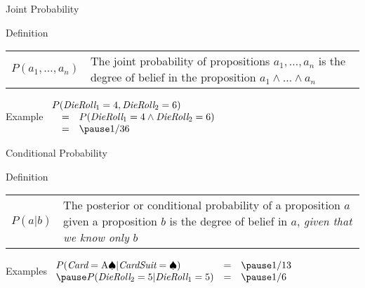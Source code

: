 \documentclass[14pt]{beamer}
\begin{document}
\begin{frame}{Joint Probability}
\begin{block}{Definition}
\begin{tabular}{lm{2.75in}}
\large $P(a_1, \ldots, a_n)$
&
The \alert{joint probability} of propositions $a_1, \ldots, a_n$ is the degree of belief in the proposition $a_1 \land \ldots \land a_n$
\end{tabular}
\end{block}
\pause
\begin{block}{Example}
$
\begin{array}{lll}
\lefteqn{P(\textit{DieRoll}_1 = 4, \textit{DieRoll}_2 = 6)} \\
& = & P(\textit{DieRoll}_1 = 4 \land \textit{DieRoll}_2 = 6) \\
& = & \pause 1/36 \\
\end{array}
$
\end{block}
\end{frame}

\begin{frame}{Conditional Probability}
\begin{block}{Definition}
\begin{tabular}{lm{3.4in}@{}}
\large $P(a|b)$
&
The \alert{posterior} or \alert{conditional probability} of a proposition $a$ given a proposition $b$ is the degree of belief in $a$, \emph{given that we know only $b$}
\end{tabular}
\end{block}
\pause
\begin{block}{Examples}
$
\begin{array}{lll}
P(\textit{Card} = \mbox{A}\spadesuit|\textit{CardSuit} = \spadesuit) & = & \pause 1/13 \\
\pause
P(\textit{DieRoll}_2 = 5|\textit{DieRoll}_1 = 5) & = & \pause 1/6 \\
\end{array}
$
\end{block}
\end{frame}
\end{document}
